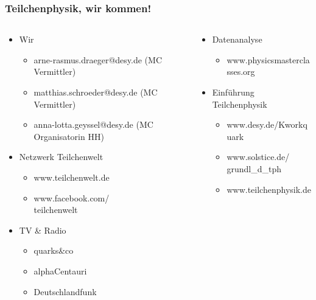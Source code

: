 \begin{frame}
  \frametitle{Teilchenphysik, wir kommen!}
  \vskip-0.5cm
  \begin{footnotesize}
    \begin{columns}[t]
      \begin{column}{0.5\textwidth}
        \begin{itemize}
        \item Wir
          \begin{itemize}
          \item arne-rasmus.draeger@desy.de (MC Vermittler)
          \item matthias.schroeder@desy.de (MC Vermittler)
          \item anna-lotta.geyssel@desy.de (MC Organisatorin HH)
          \end{itemize}
        \item Netzwerk Teilchenwelt
          \begin{itemize}
          \item www.teilchenwelt.de
          \item www.facebook.com/\\teilchenwelt
          \end{itemize}
        \item TV \& Radio
          \begin{itemize}
          \item quarks\&co
          \item alphaCentauri
          \item Deutschlandfunk
          \end{itemize}
        \end{itemize}
      \end{column}
      \begin{column}{0.5\textwidth}
        \begin{itemize}
        \item Datenanalyse
          \begin{itemize}
          \item www.physicsmasterclasses.org
          \end{itemize}
        \item Einf\"uhrung Teilchenphysik
          \begin{itemize}
          \item www.desy.de/Kworkquark
          \item www.solstice.de/\\grundl\_d\_tph
          \item www.teilchenphysik.de

\end{itemize}
\end{itemize}
\end{column}
\end{columns}
\end{footnotesize}
\end{frame}
